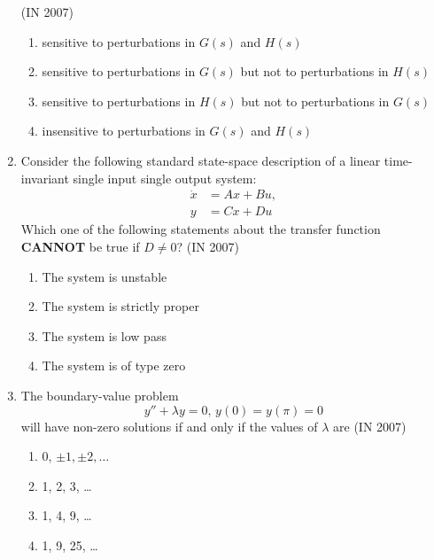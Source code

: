 \begin{enumerate}[label=\thesubsection.\arabic*,ref=\thesubsection.\theenumi]
\hfill(IN 2007)
\begin{enumerate}
\item sensitive to perturbations in $G(s)$ and $H(s)$  
\item sensitive to perturbations in $G(s)$ but not to perturbations in $H(s)$  
\item sensitive to perturbations in $H(s)$ but not to perturbations in $G(s)$  
\item insensitive to perturbations in $G(s)$ and $H(s)$  
\end{enumerate}
\item Consider the following standard state-space description of a linear time-invariant single input single output system:  
	\begin{align*}
		\dot{x} &= Ax + Bu, 
\\
		y &= Cx + Du
\end{align*}
Which one of the following statements about the transfer function \textbf{CANNOT} be true if $D \neq 0$?
\hfill(IN 2007)
\begin{multicols}{2}
\begin{enumerate}
\item The system is unstable  
\item The system is strictly proper  
\item The system is low pass  
\item The system is of type zero  
\end{enumerate}
\end{multicols}
\item The boundary-value problem $$y'' + \lambda y = 0, \, y(0)=y(\pi)=0$$ will have non-zero solutions if and only if the values of $\lambda$ are  
\hfill(IN 2007)
\begin{multicols}{2}
\begin{enumerate}
\item 0, $\pm 1, \pm 2, \dots$  
\item 1, 2, 3, \dots  
\item 1, 4, 9, \dots  
\item 1, 9, 25, \dots  
\end{enumerate}
\end{multicols}


\end{enumerate}
